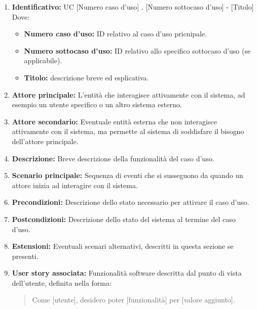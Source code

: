 \begin{enumerate}
    \item \textbf{Identificativo:} UC [Numero caso d’uso] . [Numero sottocaso d’uso] - [Titolo]\\
    \medskip Dove:
    \begin{itemize}
        \item \textbf{Numero caso d’uso:} ID relativo al caso d'uso pricnipale.
        \item \textbf{Numero sottocaso d’uso:} ID relativo allo specifico sottocaso d'uso (se applicabile).
        \item \textbf{Titolo:} descrizione breve ed esplicativa.
    \end{itemize}

    \item \textbf{Attore principale:} L'entità che interagisce attivamente con il sistema, ad esempio un utente specifico o un altro sistema esterno.

    \item \textbf{Attore secondario:} Eventuale entità esterna che non interagisce attivamente con il sistema, ma permette al sistema di soddisfare il bisogno dell’attore principale.

    \item \textbf{Descrizione:} Breve descrizione della funzionalità del caso d’uso.

    \item \textbf{Scenario principale:} Sequenza di eventi che si susseguono da quando un attore inizia ad interagire con il sistema.

    \item \textbf{Precondizioni:} Descrizione dello stato necessario per attivare il caso d’uso.

    \item \textbf{Postcondizioni:} Descrizione dello stato del sistema al termine del caso d’uso.

    \item \textbf{Estensioni:} Eventuali scenari alternativi, descritti in questa sezione se presenti.

    \item \textbf{User story associata:} Funzionalità software descritta dal punto di vista dell'utente, definita nella forma:
    \begin{quote}
        Come [utente], desidero poter [funzionalità] per [valore aggiunto].
    \end{quote}
\end{enumerate}

